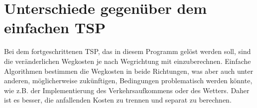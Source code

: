 \chapter{Unterschiede gegenüber dem einfachen \acl{TSP}}
\label{ch:unterschiede}

Bei dem fortgeschrittenen \acl{TSP}, das in diesem Programm gelöst werden soll, sind die veränderlichen Wegkosten je nach Wegrichtung mit einzuberechnen. Einfache Algorithmen bestimmen die Wegkosten in beide Richtungen, was aber auch unter anderen, möglicherweise zukünftigen, Bedingungen problematisch werden könnte, wie z.B. der Implementierung des Verkehrsaufkommens oder des Wetters. Daher ist es besser, die anfallenden Kosten zu trennen und separat zu berechnen. 